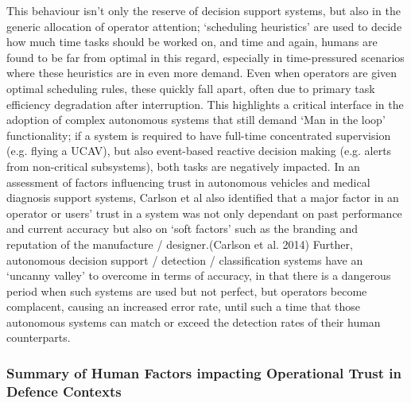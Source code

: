 This behaviour isn’t only the reserve of decision support systems, but also in the generic allocation of operator attention; ‘scheduling heuristics’ are used to decide how much time tasks should be worked on, and time and again, humans are found to be far from optimal in this regard, especially in time-pressured scenarios where these heuristics are in even more demand.
Even when operators are given optimal scheduling rules, these quickly fall apart, often due to primary task efficiency degradation after interruption.
This highlights a critical interface in the adoption of complex autonomous systems that still demand ‘Man in the loop’ functionality; if a system is required to have full-time concentrated supervision (e.g. flying a UCAV), but also event-based reactive decision making (e.g. alerts from non-critical subsystems), both tasks are negatively impacted.
In an assessment of factors influencing trust in autonomous vehicles and medical diagnosis support systems, Carlson et al also identified that a major factor in an operator or users’ trust in a system was not only dependant on past performance and current accuracy but also on ‘soft factors’ such as the branding and reputation of the manufacture / designer.(Carlson et al.
2014)
Further, autonomous decision support / detection / classification systems have an ‘uncanny valley’ to overcome in terms of accuracy, in that there is a dangerous period when such systems are used but not perfect, but operators become complacent, causing an increased error rate, until such a time that those autonomous systems can match or exceed the detection rates of their human counterparts.

\subsubsection{Summary of Human Factors impacting Operational Trust in Defence Contexts}

